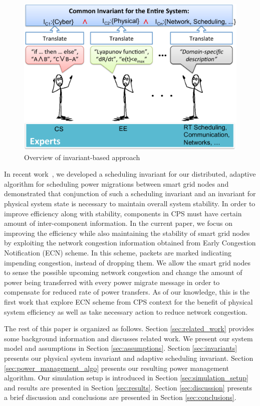 \begin{figure}[htb]
  \begin{center}
     \includegraphics[width=0.9\columnwidth]{Figures/Invariant_Overview.pdf}
  \caption{Overview of invariant-based approach}
  \label{fig:invariant_conjunction}
  \end{center}
\end{figure}

In recent work~\cite{acsmartgrid}, we developed a 
scheduling invariant for our distributed, adaptive algorithm for scheduling power 
migrations between smart grid nodes and demonstrated that conjunction of such a
scheduling invariant and an invariant for physical system state is necessary to 
maintain overall system stability. In order to improve efficiency along with stability, components in CPS must have certain amount of inter-component information. In the current paper, we focus on 
improving the efficiency while also maintaining the stability of smart grid nodes 
by exploiting the network congestion information obtained from Early Congestion 
Notification (ECN) scheme. In this scheme, packets are marked indicating impending congestion,
instead of dropping them\cite{floyd1994tcp, ramakrishnan1999proposal, 
ramakrishnan2001addition}. We allow the smart grid nodes to sense the possible 
upcoming network congestion and change the amount of power being transferred with 
every power migrate message in order to compensate for reduced rate of power transfers.
As of our knowledge, this is the first work that explore ECN scheme from CPS context
for the benefit of physical system efficiency as well as take necessary action to 
reduce network congestion.

The rest of this paper is organized as follows. Section \ref{sec:related_work}
provides some background information and discusses related work. We present our
system model and assumptions in Section \ref{sec:assumptions}. Section
\ref{sec:invariants} presents our physical system 
invariant and adaptive scheduling invariant. Section \ref{sec:power_management_algo} 
presents our resulting power management algorithm. Our simulation setup is introduced 
in Section \ref{sec:simulation_setup} and results are presented in Section
\ref{sec:results}. Section \ref{sec:discussion} presents a brief discussion and
conclusions are presented in Section \ref{sec:conclusions}.

